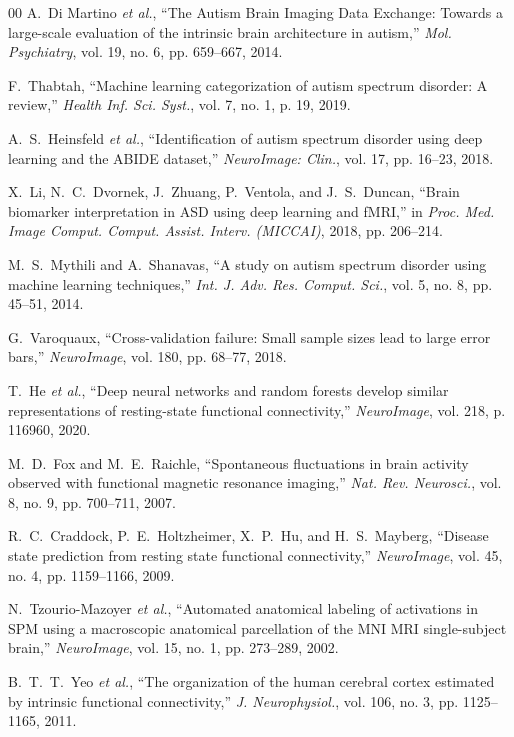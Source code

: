 \documentclass[journal]{IEEEtran}
\begin{document}
\begin{thebibliography}{00}
A.~Di Martino \textit{et al.}, ``The Autism Brain Imaging Data Exchange: Towards a large-scale evaluation of the intrinsic brain architecture in autism,'' \textit{Mol. Psychiatry}, vol. 19, no. 6, pp. 659--667, 2014.

F.~Thabtah, ``Machine learning categorization of autism spectrum disorder: A review,'' \textit{Health Inf. Sci. Syst.}, vol. 7, no. 1, p. 19, 2019.

A.~S.~Heinsfeld \textit{et al.}, ``Identification of autism spectrum disorder using deep learning and the ABIDE dataset,'' \textit{NeuroImage: Clin.}, vol. 17, pp. 16--23, 2018.

X.~Li, N.~C.~Dvornek, J.~Zhuang, P.~Ventola, and J.~S.~Duncan, ``Brain biomarker interpretation in ASD using deep learning and fMRI,'' in \textit{Proc. Med. Image Comput. Comput. Assist. Interv. (MICCAI)}, 2018, pp. 206--214.

M.~S.~Mythili and A.~Shanavas, ``A study on autism spectrum disorder using machine learning techniques,'' \textit{Int. J. Adv. Res. Comput. Sci.}, vol. 5, no. 8, pp. 45--51, 2014.

G.~Varoquaux, ``Cross-validation failure: Small sample sizes lead to large error bars,'' \textit{NeuroImage}, vol. 180, pp. 68--77, 2018.

T.~He \textit{et al.}, ``Deep neural networks and random forests develop similar representations of resting-state functional connectivity,'' \textit{NeuroImage}, vol. 218, p. 116960, 2020.

M.~D.~Fox and M.~E.~Raichle, ``Spontaneous fluctuations in brain activity observed with functional magnetic resonance imaging,'' \textit{Nat. Rev. Neurosci.}, vol. 8, no. 9, pp. 700--711, 2007.

R.~C.~Craddock, P.~E.~Holtzheimer, X.~P.~Hu, and H.~S.~Mayberg, ``Disease state prediction from resting state functional connectivity,'' \textit{NeuroImage}, vol. 45, no. 4, pp. 1159--1166, 2009.

N.~Tzourio-Mazoyer \textit{et al.}, ``Automated anatomical labeling of activations in SPM using a macroscopic anatomical parcellation of the MNI MRI single-subject brain,'' \textit{NeuroImage}, vol. 15, no. 1, pp. 273--289, 2002.

B.~T.~T.~Yeo \textit{et al.}, ``The organization of the human cerebral cortex estimated by intrinsic functional connectivity,'' \textit{J. Neurophysiol.}, vol. 106, no. 3, pp. 1125--1165, 2011.


\end{thebibliography}
\end{document}
